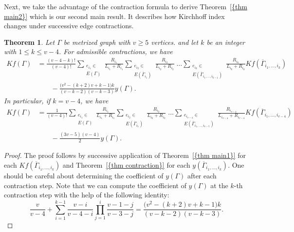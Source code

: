 \documentclass[12pt]{amsart}
\newtheorem{theorem}{Theorem}[section]
\theoremstyle{example}
\theoremstyle{definition}
\theoremstyle{notation}
\begin{document}
Next, we take the advantage of the contraction formula to derive {Theorem~\ref{{thm main2}}} which is our second main result.
It describes how Kirchhoff index changes under successive edge contractions.
\begin{theorem}\label{thm main2}
Let ${\Gamma}$ be metrized graph with $v \geq 5$ vertices.
and let $k$ be an integer with $1 \leq k \leq v-4$. For admissible contractions, we have
\begin{equation*}
\begin{split}
Kf({\Gamma})&= \frac{(v-4-k)!}{(v-4)!}\sum_{\substack{e_{i_1} \in
\\ {E({\Gamma})}}}\frac{R_{i_1}}{L_{i_1}+R_{i_1}} \sum_{\substack{e_{i_2} \in
\\ {E({{{\overline{\Gamma}}}_{i_1}})}}}\frac{R_{i_2}}{L_{i_2}+R_{i_2}}
\; \dots
\sum_{ \substack{e_{i_k} \in
\\ {E({{{\overline{\Gamma}}}_{i_1, \dots, i_{k-1}}})}} }
\frac{R_{i_k}}{L_{i_k}+R_{i_k}} Kf({{\overline{\Gamma}}}_{i_1,\dots, i_k})\\
& \qquad
-\frac{\big(v^2-(k+2)v+k-1 \big)k}{(v-k-2)(v-k-3) }y({\Gamma}).
\end{split}
\end{equation*}
In particular, if $k=v-4$, we have
\begin{equation*}
\begin{split}
Kf({\Gamma})&= \frac{1}{(v-4)!}\sum_{\substack{e_{i_1} \in
\\ {E({\Gamma})}}}\frac{R_{i_1}}{L_{i_1}+R_{i_1}} \sum_{\substack{e_{i_2} \in
\\ {E({{{\overline{\Gamma}}}_{i_1}})}}}\frac{R_{i_2}}{L_{i_2}+R_{i_2}}
\; \dots
\sum_{ \substack{e_{i_{v-4}} \in
\\ {E({{{\overline{\Gamma}}}_{i_1, \dots, i_{v-5}}})}} }
\frac{R_{i_{v-4}}}{L_{i_{v-4}}+R_{i_{v-4}}} Kf({{\overline{\Gamma}}}_{i_1,\dots, i_{v-4}})\\
& \qquad
-\frac{(3v-5)(v-4)}{ 2}y({\Gamma}).
\end{split}
\end{equation*}
\end{theorem}
\begin{proof}
The proof follows by successive application of {Theorem~\ref{{thm main1}}} for each $Kf({{\overline{\Gamma}}}_{i_1,\dots, i_k})$ and {Theorem~\ref{{thm contraction}}} for each $y({{\overline{\Gamma}}}_{i_1,\dots, i_k})$. One should be careful about determining the coefficient of $y({\Gamma})$ after each contraction step. Note that we can compute the coefficient of $y({\Gamma})$ at the $k$-th contraction step with the help of the following identity:
$$\frac{v}{v-4}+\sum_{i=1}^{k-1}\frac{v-i}{v-4-i}\prod_{j=1}^{i}\frac{v-1-j}{v-3-j}=\frac{\big(v^2-(k+2)v+k-1 \big)k}{(v-k-2)(v-k-3) }.$$
\end{proof}
\end{document}
